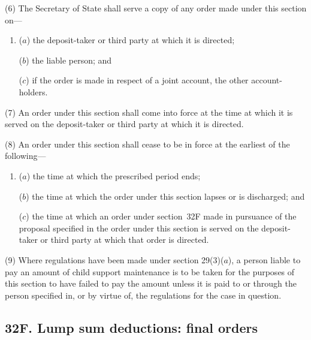 \documentclass[12pt,a4paper]{article}
\begin{document}
(6) The 
Secretary of State  %
shall serve a copy of any order made under this section on---
\begin{enumerate}\item[]
($a$)
the deposit-taker or third party at which it is directed;

($b$)
the liable person; and

($c$)
if the order is made in respect of a joint account, the other account-holders.
\end{enumerate}

(7) An order under this section shall come into force at the time at which it is served on the deposit-taker or third party at which it is directed.

(8) An order under this section shall cease to be in force at the earliest of the following---
\begin{enumerate}\item[]
($a$)
the time at which the prescribed period ends;

($b$)
the time at which the order under this section lapses or is discharged; and

($c$)
the time at which an order under section~32F made in pursuance of the proposal specified in the order under this section is served on the deposit-taker or third party at which that order is directed.
\end{enumerate}

\begin{sloppypar}
(9) Where regulations have been made under section 29(3)($a$), a person liable to pay an amount of child support maintenance is to be taken for the purposes of this section to have failed to pay the amount unless it is paid to or through the person specified in, or by virtue of, the regulations for the case in question.
\end{sloppypar}


\subsection{32F. Lump sum deductions: final orders}
\end{document}
